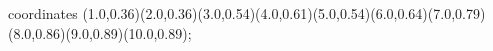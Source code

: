 					coordinates { (1.0,0.36)(2.0,0.36)(3.0,0.54)(4.0,0.61)(5.0,0.54)(6.0,0.64)(7.0,0.79)(8.0,0.86)(9.0,0.89)(10.0,0.89)};